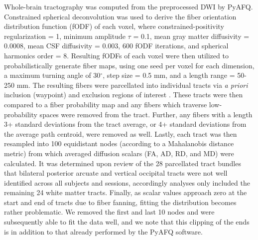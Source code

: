 \documentclass[12pt]{article}
\begin{document}
Whole-brain tractography was computed from the preprocessed DWI by PyAFQ. Constrained spherical deconvolution was used to derive the fiber orientation distribution function (fODF) of each voxel, where constrained-positivity regularization = 1, minimum amplitude $\tau$ = 0.1, mean gray matter diffusivity = 0.0008, mean CSF diffusivity = 0.003, 600 fODF iterations, and spherical harmonics order = 8. Resulting fODFs of each voxel were then utilized to probabilistically generate fiber maps, using one seed per voxel for each dimension, a maximum turning angle of 30$^\circ$, step size = 0.5 mm, and a length range = 50-250 mm. The resulting fibers were parcellated into individual tracts via \textit{a priori} inclusion (waypoint) and exclusion regions of interest \parencite{wakana2007ReproducibilityQuantitativeTractography}. These tracts were then compared to a fiber probability map \parencite{hua2008TractProbabilityMaps} and any fibers which traverse low-probability spaces were removed from the tract. Further, any fibers with a length 3+ standard deviations from the tract average, or 4+ standard deviations from the average path centroid, were removed as well. Lastly, each tract was then resampled into 100 equidistant nodes (according to a Mahalanobis distance metric) from which averaged diffusion scalars (FA, AD, RD, and MD) were calculated. It was determined upon review of the 28 parcellated tract bundles that bilateral posterior arcuate and vertical occipital tracts were not well identified across all subjects and sessions, accordingly analyses only included the remaining 24 white matter tracts. Finally, as scalar values approach zero at the start and end of tracts due to fiber fanning, fitting the distribution becomes rather problematic. We removed the first and last 10 nodes and were subsequently able to fit the data well, and we note that this clipping of the ends is in addition to that already performed by the PyAFQ software.

\end{document}
